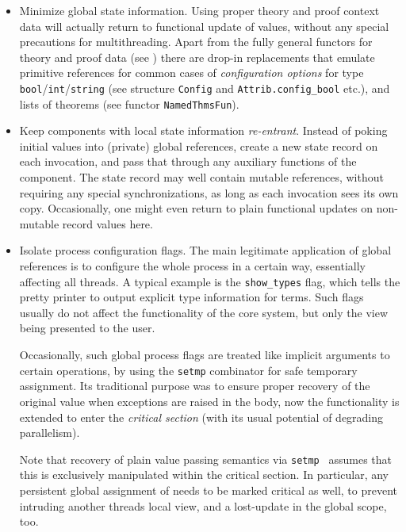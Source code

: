\begin{isabellebody}
\begin{isamarkuptext}
  \begin{itemize}

  \item Minimize global state information.  Using proper theory and
  proof context data will actually return to functional update of
  values, without any special precautions for multithreading.  Apart
  from the fully general functors for theory and proof data (see
  ) there are drop-in replacements that
  emulate primitive references for common cases of \emph{configuration
  options} for type \verb|bool|/\verb|int|/\verb|string| (see structure \verb|Config| and \verb|Attrib.config_bool| etc.), and lists of theorems (see functor
  \verb|NamedThmsFun|).

  \item Keep components with local state information
  \emph{re-entrant}.  Instead of poking initial values into (private)
  global references, create a new state record on each invocation, and
  pass that through any auxiliary functions of the component.  The
  state record may well contain mutable references, without requiring
  any special synchronizations, as long as each invocation sees its
  own copy.  Occasionally, one might even return to plain functional
  updates on non-mutable record values here.

  \item Isolate process configuration flags.  The main legitimate
  application of global references is to configure the whole process
  in a certain way, essentially affecting all threads.  A typical
  example is the \verb|show_types| flag, which tells the pretty printer
  to output explicit type information for terms.  Such flags usually
  do not affect the functionality of the core system, but only the
  view being presented to the user.

  Occasionally, such global process flags are treated like implicit
  arguments to certain operations, by using the \verb|setmp| combinator
  for safe temporary assignment.  Its traditional purpose was to
  ensure proper recovery of the original value when exceptions are
  raised in the body, now the functionality is extended to enter the
  \emph{critical section} (with its usual potential of degrading
  parallelism).

  Note that recovery of plain value passing semantics via \verb|setmp|~ assumes that this  is
  exclusively manipulated within the critical section.  In particular,
  any persistent global assignment of  needs to
  be marked critical as well, to prevent intruding another threads
  local view, and a lost-update in the global scope, too.


\end{itemize}
\end{isamarkuptext}
\end{isabellebody}
